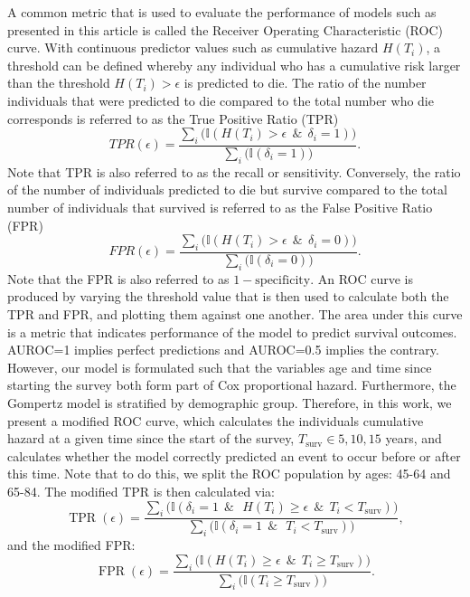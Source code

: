\documentclass[
]{article}
\begin{document}
A common metric that is used to evaluate the performance of models such as presented in this article is called the Receiver Operating Characteristic (ROC) curve. With continuous predictor values such as cumulative hazard \(H(T_i)\), a threshold can be defined whereby any individual who has a cumulative risk larger than the threshold \(H(T_i)>\epsilon\) is predicted to die. The ratio of the number individuals that were predicted to die compared to the total number who die corresponds is referred to as the True Positive Ratio (TPR)
\begin{equation}
  TPR(\epsilon)=\frac{\sum_i\big(\mathbb{I}(H(T_i)>\epsilon \ \ \& \ \ \delta_i=1)\big)}{\sum_i\big(\mathbb{I}(\delta_i=1)\big)}.
\end{equation}
Note that TPR is also referred to as the recall or sensitivity. Conversely, the ratio of the number of individuals predicted to die but survive compared to the total number of individuals that survived is referred to as the False Positive Ratio (FPR)
\begin{equation}
  FPR(\epsilon)=\frac{\sum_i\big(\mathbb{I}(H(T_i)>\epsilon \ \ \& \ \ \delta_i=0)\big)}{\sum_i\big(\mathbb{I}(\delta_i=0)\big)}.
\end{equation}
Note that the FPR is also referred to as \(1-\mathrm{specificity}\). An ROC curve is produced by varying the threshold value that is then used to calculate both the TPR and FPR, and plotting them against one another.
The area under this curve is a metric that indicates performance of the model to predict survival outcomes. AUROC=1 implies perfect predictions and AUROC=0.5 implies the contrary. However, our model is formulated such that the variables age and time since starting the survey both form part of Cox proportional hazard. Furthermore, the Gompertz model is stratified by demographic group. Therefore, in this work, we present a modified ROC curve, which calculates the individuals cumulative hazard at a given time since the start of the survey, \(T_{\mathrm{surv}} \in {5, 10, 15}\) years, and calculates whether the model correctly predicted an event to occur before or after this time.
Note that to do this, we split the ROC population by ages: 45-64 and 65-84. The modified TPR is then calculated via:
\begin{equation}
  \operatorname{TPR}(\epsilon)=\frac{\sum_i\big(\mathbb{I}(\delta_i=1 \ \ \& \ \ \ H(T_i)\geq \epsilon \ \ \& \ \ T_i<T_{\mathrm{surv}})\big)}{\sum_i\big(\mathbb{I}(\delta_i=1 \ \ \& \ \ \ T_i<T_{\mathrm{surv}})\big)},
\end{equation}
and the modified FPR:
\begin{equation}
  \operatorname{FPR}(\epsilon)=\frac{\sum_i\big(\mathbb{I}(H(T_i)\geq \epsilon \ \ \& \ \ T_i\geq T_{\mathrm{surv}})\big)}{\sum_i\big(\mathbb{I}(T_i\geq T_{\mathrm{surv}})\big)}.
\end{equation}
\end{document}
